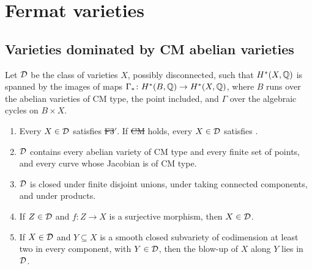 \section{Fermat varieties}\label{sec:fermat}

\subsection{Varieties dominated by CM abelian varieties}

\begin{definition}\label{def:classD}
Let $\mathcal{D}$ be the class of varieties $X$, possibly disconnected, such that
$H^{*}(X,\mathbb{Q})$ is spanned by the images of maps $\Gamma_{*}\colon
H^{*}(B,\mathbb{Q})\to H^{*}(X,\mathbb{Q})$, where $B$ runs over the abelian varieties of
CM type, the point included, and $\Gamma$ over the algebraic cycles on
$B\times X$.
\end{definition}

\begin{proposition}\label{prop:classD}
\begin{enumerate}[label=\textup{(\roman*)}]
\item Every $X\in\mathcal{D}$ satisfies \st{F3$'$}. If \st{CM} holds, every
$X\in\mathcal{D}$ satisfies \HC.
\item $\mathcal{D}$ contains every abelian variety of CM type and every finite set of
points, and every curve whose Jacobian is of CM type.
\item $\mathcal{D}$ is closed under finite disjoint unions, under taking connected
components, and under products.
\item If $Z\in\mathcal{D}$ and $f\colon Z\to X$ is a surjective morphism, then
$X\in\mathcal{D}$.
\item If $X\in\mathcal{D}$ and $Y\subseteq X$ is a smooth closed subvariety of
codimension at least two in every component, with $Y\in\mathcal{D}$, then the
blow-up of $X$ along $Y$ lies in $\mathcal{D}$.
\end{enumerate}
\end{proposition}


